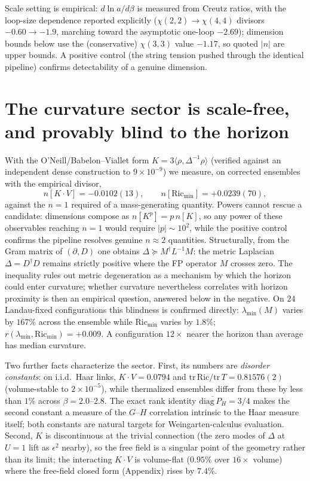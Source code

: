 \documentclass[11pt]{article}
\begin{document}
Scale setting is empirical: $d\ln a/d\beta$ is measured from Creutz ratios, with the
loop-size dependence reported explicitly ($\chi(2,2)\to\chi(4,4)$ divisors
$-0.60\to-1.9$, marching toward the asymptotic one-loop $-2.69$); dimension bounds below
use the (conservative) $\chi(3,3)$ value $-1.17$, so quoted $|n|$ are upper bounds. A
positive control (the string tension pushed through the identical pipeline) confirms
detectability of a genuine dimension.

\section{The curvature sector is scale-free, and provably blind to the horizon}
\label{sec:curv}
With the O'Neill/Babelon--Viallet form $K=3\langle\rho,\Delta^{-1}\rho\rangle$ (verified
against an independent dense construction to $9\times10^{-9}$) we measure, on corrected
ensembles with the empirical divisor,
\[
n[K\!\cdot\!V] = -0.0102(13),\qquad n[\mathrm{Ric}_{\min}] = +0.0239(70),
\]
against the $n=1$ required of a mass-generating quantity. Powers cannot rescue a candidate: dimensions compose as $n[K^{p}]=p\,n[K]$, so any power of these observables reaching $n=1$ would require $|p|\sim 10^{2}$, while the positive control confirms the pipeline resolves genuine $n\approx2$ quantities. Structurally, from the Gram
matrix of $(\partial,D)$ one obtains $\Delta \succeq M^{\dagger}L^{-1}M$: the metric
Laplacian $\Delta=D^{\dagger}D$ remains strictly positive where the FP operator $M$
crosses zero. The inequality rules out metric degeneration as a mechanism by which the
horizon could enter curvature; whether curvature nevertheless correlates with horizon
proximity is then an empirical question, answered below in the negative. On $24$ Landau-fixed configurations this blindness is confirmed
directly: $\lambda_{\min}(M)$ varies by $167\%$ across the ensemble while
$\mathrm{Ric}_{\min}$ varies by $1.8\%$; $r(\lambda_{\min},\mathrm{Ric}_{\min})=+0.009$.
A configuration $12\times$ nearer the horizon than average has median curvature.

Two further facts characterize the sector. First, its numbers are \emph{disorder
constants}: on i.i.d.\ Haar links, $K\!\cdot\!V=0.0794$ and
$\mathrm{tr}\,\mathrm{Ric}/\mathrm{tr}\,T=0.81576(2)$ (volume-stable to
$2\times10^{-5}$), while thermalized ensembles differ from these by less than $1\%$
across $\beta=2.0$--$2.8$. The exact rank identity
$\overline{\mathrm{diag}\,P_H}=3/4$ makes the second constant a measure of the $G$--$H$
correlation intrinsic to the Haar measure itself; both constants are natural targets for
Weingarten-calculus evaluation. Second, $K$ is discontinuous at the trivial connection
(the zero modes of $\Delta$ at $U=1$ lift as $\epsilon^2$ nearby), so the free field is a
singular point of the geometry rather than its limit; the interacting
$K\!\cdot\!V$ is volume-flat ($0.95\%$ over $16\times$ volume) where the free-field
closed form (Appendix) rises by $7.4\%$.
\end{document}
